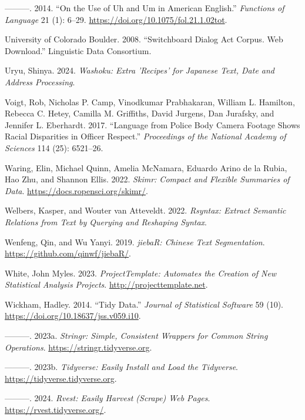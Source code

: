 \documentclass[
  letterpaper,
  DIV=11,
  numbers=noendperiod]{scrreprt}
\newlength{\cslhangindent}
\newenvironment{CSLReferences}[2] %
 {\begin{list}{}{%
  \setlength{\itemindent}{0pt}
  \setlength{\leftmargin}{0pt}
  \setlength{\parsep}{0pt}
  \ifodd #1
   \setlength{\leftmargin}{\cslhangindent}
   \setlength{\itemindent}{-1\cslhangindent}
  \fi
  \setlength{\itemsep}{#2\baselineskip}}}
 {\end{list}}
\theoremstyle{definition}
\theoremstyle{remark}
\begin{document}
\begin{CSLReferences}{1}{0}
---------. 2014. {``On the Use of Uh and Um in American English.''}
\emph{Functions of Language} 21 (1): 6--29.
\url{https://doi.org/10.1075/fol.21.1.02tot}.

University of Colorado Boulder. 2008. {``Switchboard Dialog Act Corpus.
Web Download.''} Linguistic Data Consortium.

Uryu, Shinya. 2024. \emph{Washoku: Extra 'Recipes' for Japanese Text,
Date and Address Processing}.

Voigt, Rob, Nicholas P. Camp, Vinodkumar Prabhakaran, William L.
Hamilton, Rebecca C. Hetey, Camilla M. Griffiths, David Jurgens, Dan
Jurafsky, and Jennifer L. Eberhardt. 2017. {``Language from Police Body
Camera Footage Shows Racial Disparities in Officer Respect.''}
\emph{Proceedings of the National Academy of Sciences} 114 (25):
6521--26.

Waring, Elin, Michael Quinn, Amelia McNamara, Eduardo Arino de la Rubia,
Hao Zhu, and Shannon Ellis. 2022. \emph{Skimr: Compact and Flexible
Summaries of Data}. \url{https://docs.ropensci.org/skimr/}.

Welbers, Kasper, and Wouter van Atteveldt. 2022. \emph{Rsyntax: Extract
Semantic Relations from Text by Querying and Reshaping Syntax}.

Wenfeng, Qin, and Wu Yanyi. 2019. \emph{jiebaR: Chinese Text
Segmentation}. \url{https://github.com/qinwf/jiebaR/}.

White, John Myles. 2023. \emph{ProjectTemplate: Automates the Creation
of New Statistical Analysis Projects}. \url{http://projecttemplate.net}.

Wickham, Hadley. 2014. {``Tidy Data.''} \emph{Journal of Statistical
Software} 59 (10). \url{https://doi.org/10.18637/jss.v059.i10}.

---------. 2023a. \emph{Stringr: Simple, Consistent Wrappers for Common
String Operations}. \url{https://stringr.tidyverse.org}.

---------. 2023b. \emph{Tidyverse: Easily Install and Load the
Tidyverse}. \url{https://tidyverse.tidyverse.org}.

---------. 2024. \emph{Rvest: Easily Harvest (Scrape) Web Pages}.
\url{https://rvest.tidyverse.org/}.


\end{CSLReferences}
\end{document}
